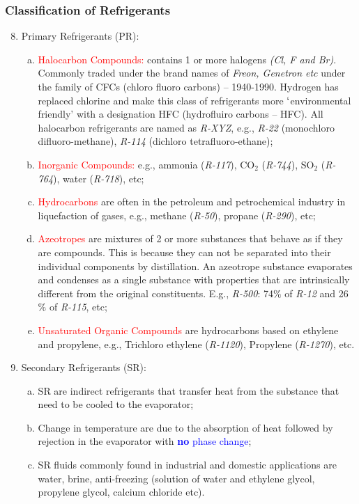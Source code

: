 \documentclass[10pt,compress]{beamer}
\begin{document}
\begin{frame}
 \frametitle{Classification of Refrigerants}
 \begin{enumerate}[1]\setcounter{enumi}{7}\scriptsize
   \item<1-> Primary Refrigerants (PR): 
     \begin{enumerate}[(a)]\scriptsize
       \item<1-> \textcolor{red}{Halocarbon Compounds:} contains 1 or more halogens {\it (Cl, F and Br)}. Commonly traded under the brand names of {\it Freon, Genetron etc} under the family of CFCs (chloro fluoro carbons) -- 1940-1990. Hydrogen has replaced chlorine and make this class of refrigerants more $\lq$environmental friendly' with a designation HFC (hydrofluiro carbons -- HFC). All halocarbon refrigerants are named as {\it R-XYZ}, e.g., {\it R-22} (monochloro difluoro-methane), {\it R-114} (dichloro tetrafluoro-ethane); 
       \item<1-> \textcolor{red}{Inorganic Compounds:} e.g., ammonia ({\it R-117}), CO$_{2}$ ({\it R-744}), SO$_{2}$ ({\it R-764}), water ({\it R-718}), etc;
       \item <1-> \textcolor{red}{Hydrocarbons} are often in the petroleum and petrochemical industry in liquefaction of gases, e.g., methane ({\it R-50}), propane ({\it R-290}), etc;
       \item <1-> \textcolor{red}{Azeotropes} are mixtures of 2 or more substances that behave as if they are compounds. This is because they can not be separated into their individual components by distillation. An azeotrope substance evaporates and condenses as a single substance with properties that are intrinsically different from the original constituents. E.g., {\it R-500}: 74$\%$ of {\it R-12} and 26$\%$ of {\it R-115}, etc;
       \item <1-> \textcolor{red}{Unsaturated Organic Compounds} are hydrocarbons based on ethylene and propylene, e.g., Trichloro ethylene ({\it R-1120}), Propylene ({\it R-1270}), etc.
     \end{enumerate}
   \item<2-> Secondary Refrigerants (SR): 
     \begin{enumerate}[(a)]\scriptsize
       \item <2-> SR are indirect refrigerants that transfer heat from the substance that need to be cooled to the evaporator; 
       \item <2-> Change in temperature are due to the absorption of heat followed by rejection in the evaporator with \textcolor{blue}{{\bf no} phase change};
       \item <2-> SR fluids commonly found in industrial and domestic applications are water, brine, anti-freezing (solution of water and ethylene glycol, propylene glycol, calcium chloride etc).
     \end{enumerate}
 \end{enumerate}
\end{frame}
\end{document}
